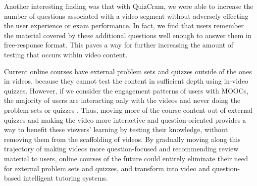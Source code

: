 \documentclass{chi-ext}
\begin{document}
Another interesting finding was that with QuizCram, we were able to increase the number of questions associated with a video segment without adversely effecting the user experience or exam performance. In fact, we find that users remember the material covered by these additional questions well enough to answer them in free-response format. This paves a way for further increasing the amount of testing that occurs within video content.

Current online courses have external problem sets and quizzes outside of the ones in videos, because they cannot test the content in sufficient depth using in-video quizzes. However, if we consider the engagement patterns of users with MOOCs, the majority of users are interacting only with the videos and never doing the problem sets or quizzes \cite{anderson2014engaging}. Thus, moving more of the course content out of external quizzes and making the video more interactive and question-oriented provides a way to benefit these viewers' learning by testing their knowledge, without removing them from the scaffolding of videos. By gradually moving along this trajectory of making videos more question-focused and recommending review material to users, online courses of the future could entirely eliminate their need for external problem sets and quizzes, and transform into video and question-based intelligent tutoring systems.


\end{document}
